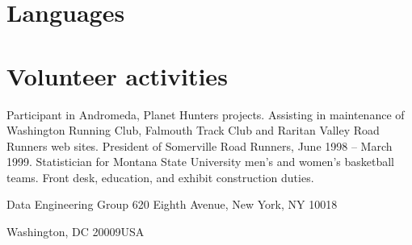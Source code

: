 \documentclass[11pt]{moderncv}  %
\begin{document}
\section{Languages}

\section{Volunteer activities}
  {Participant in Andromeda, Planet Hunters projects.}
  {Assisting in maintenance of Washington Running Club, Falmouth
  Track Club and Raritan Valley Road Runners web sites.
   President of Somerville Road Runners, June 1998 -- March 1999.}
  {Statistician for Montana State University men's and women's basketball
  teams.}
  {Front desk, education, and exhibit construction duties.}

\recipient
{Data Engineering Group}
{620 Eighth Avenue, New York, NY 10018}



\address{1735 S Street NW}{Washington, DC  20009}{USA}

\end{document}
